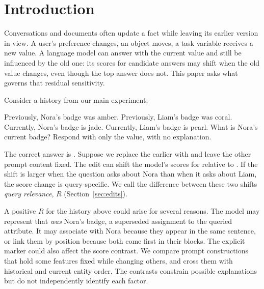 \section{Introduction}
\label{sec:introduction}

Conversations and documents often update a fact while leaving its earlier version in view. A user's preference changes, an object moves, a task variable receives a new value. A language model can answer with the current value and still be influenced by the old one: its scores for candidate answers may shift when the old value changes, even though the top answer does not. This paper asks what governs that residual sensitivity.

Consider a history from our main experiment:

\begin{prompt}
Previously, Nora’s badge was amber.
Previously, Liam’s badge was coral.
Currently, Nora’s badge is jade.
Currently, Liam’s badge is pearl.
What is Nora’s current badge?
Respond with only the value, with no explanation.
\end{prompt}

The correct answer is . Suppose we replace the earlier  with  and leave the other prompt content fixed. The edit can shift the model's scores for  relative to . If the shift is larger when the question asks about Nora than when it asks about Liam, the score change is query-specific. We call the difference between these two shifts \emph{query relevance}, $R$ (Section~\ref{sec:edits}).

A positive $R$ for the history above could arise for several reasons. The model may represent that  \emph{was} Nora's badge, a superseded assignment to the queried attribute. It may associate  with Nora because they appear in the same sentence, or link them by position because both come first in their blocks. The explicit marker  could also affect the score contrast. We compare prompt constructions that hold some features fixed while changing others, and cross them with historical and current entity order. The contrasts constrain possible explanations but do not independently identify each factor.

